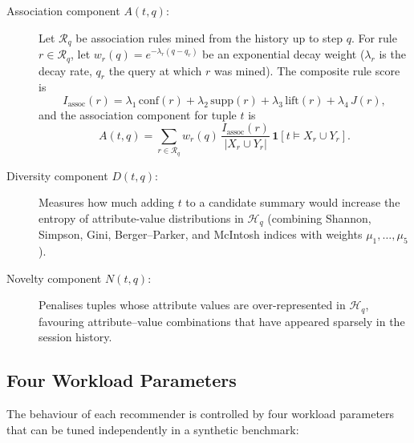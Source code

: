 \begin{description}
  \item[Association component $A(t,q)$:]
    Let $\mathcal{R}_q$ be association rules mined from the history up to step
    $q$.  For rule $r \in \mathcal{R}_q$, let
    $w_r(q) = e^{-\lambda_r (q - q_r)}$ be an exponential decay weight
    ($\lambda_r$ is the decay rate, $q_r$ the query at which $r$ was mined).
    The composite rule score is
    \begin{equation}
      I_{\mathrm{assoc}}(r)
      = \lambda_1\,\mathrm{conf}(r) + \lambda_2\,\mathrm{supp}(r)
      + \lambda_3\,\mathrm{lift}(r) + \lambda_4\,J(r),
      \label{eq:Iassoc}
    \end{equation}
    and the association component for tuple $t$ is
    \begin{equation}
      A(t,q)
      = \sum_{r \in \mathcal{R}_q}
        w_r(q)\,\frac{I_{\mathrm{assoc}}(r)}{|X_r \cup Y_r|}\,
        \mathbf{1}[t \models X_r \cup Y_r].
      \label{eq:Acomponent}
    \end{equation}

  \item[Diversity component $D(t,q)$:]
    Measures how much adding $t$ to a candidate summary would increase the
    entropy of attribute-value distributions in $\mathcal{H}_q$ (combining
    Shannon, Simpson, Gini, Berger--Parker, and McIntosh indices with weights
    $\mu_1, \ldots, \mu_5$).

  \item[Novelty component $N(t,q)$:]
    Penalises tuples whose attribute values are over-represented in
    $\mathcal{H}_q$, favouring attribute–value combinations that have appeared
    sparsely in the session history.
\end{description}

\subsection{Four Workload Parameters}
\label{sec:theory:params}

The behaviour of each recommender is controlled by four workload parameters
that can be tuned independently in a synthetic benchmark:

